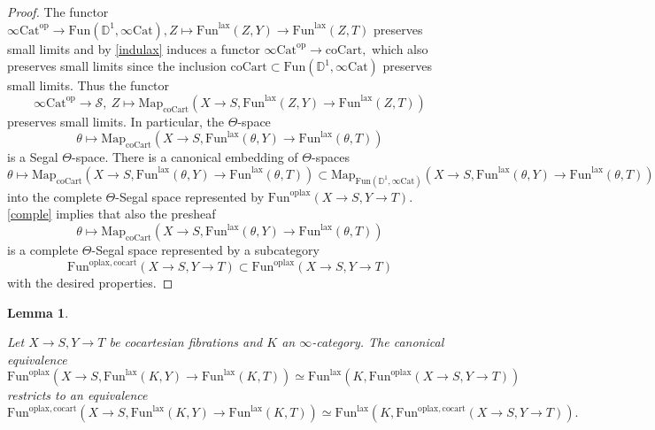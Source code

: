 \documentclass[10pt,oneside]{article}
\numberwithin{equation}{section} %
\numberwithin{figure}{section} %
\theoremstyle{plain}
\newtheorem{lemma}[theorem]{Lemma}
\theoremstyle{definition}
\newcommand{\bD}{{\mathbb D}}
\newcommand{\mS}{{\mathcal S}}
\newcommand{\op}{\mathrm{op}}
\newcommand{\co}{\mathrm{co}}
\newcommand{\Cat}{\mathrm{Cat}}
\newcommand{\Fun}{\mathrm{Fun}}
\newcommand{\cocart}{{\mathrm{cocart}}}
\newcommand{\coCart}{{\mathrm{coCart}}}
\newcommand{\Cart}{{\mathrm{Cart}}}
\newcommand{\lax}{{\mathrm{lax}}}
\newcommand{\oplax}{{\mathrm{oplax}}}
\newcommand{\Map}{{\mathrm{Map}}}
\begin{document}
\begin{proof}

The functor $ \infty\Cat^\op \to \Fun(\bD^1 ,\infty\Cat), Z \mapsto \Fun^\lax(Z,Y) \to \Fun^\lax(Z,T) $
preserves small limits and by \cref{indulax} induces a functor 
$\infty\Cat^\op \to \co\Cart,$
which also preserves small limits since the inclusion $\coCart \subset \Fun(\bD^1 ,\infty\Cat)$ preserves small limits. 
Thus the functor
$$\infty\Cat^\op \to \mS, \ Z \mapsto \Map_{\coCart}(X \to S, \Fun^\lax(Z, Y) \to \Fun^\lax(Z, T)) $$ preserves small limits. 
In particular, the $\Theta$-space 
$$\theta \mapsto \Map_{\coCart}(X \to S , \Fun^\lax(\theta, Y) \to \Fun^\lax(\theta, T)) $$ is a Segal $\Theta$-space.
There is a canonical embedding of $\Theta$-spaces
$$\theta \mapsto \Map_{\coCart}(X \to S , \Fun^\lax(\theta, Y) \to \Fun^\lax(\theta, T)) \subset \Map_{\Fun(\bD^1,\infty\Cat)}(X \to S, \Fun^\lax(\theta, Y) \to \Fun^\lax(\theta, T))$$
into the complete $\Theta$-Segal space represented by
$\Fun^{\oplax}(X\to S,Y\to T)$. 
\cref{comple} implies that also the presheaf $$\theta \mapsto \Map_{\coCart}(X \to S , \Fun^\lax(\theta, Y) \to \Fun^\lax(\theta, T))$$ is a complete $\Theta$-Segal space represented by a subcategory $$\Fun^{\oplax, \cocart}(X \to S,Y \to T) \subset \Fun^{\oplax}(X \to S,Y \to T)$$ with the desired properties.
\end{proof}


\begin{lemma}\label{cotensol}

Let $X \to S, Y \to T$ be cocartesian fibrations and $K$ an $\infty$-category. The canonical equivalence
$$ \Fun^\oplax(X \to S, \Fun^\lax(K,Y) \to  \Fun^\lax(K,T)) \simeq \Fun^\lax(K,\Fun^\oplax(X \to S,Y \to T)) $$
restricts to an equivalence
$$ \Fun^{\oplax, \cocart}(X \to S, \Fun^\lax(K,Y) \to \Fun^\lax(K,T)) \simeq \Fun^\lax(K,\Fun^{\oplax, \cocart}(X \to S,Y \to T)). $$
    
\end{lemma}
\end{document}
